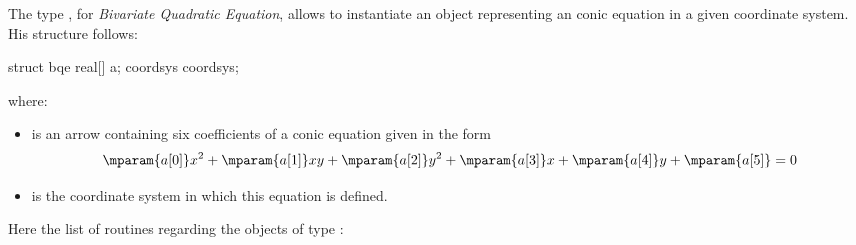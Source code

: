 \documentclass[pdftex]{article}
\begin{document}
The type , for \emph{Bivariate Quadratic Equation}, allows
to instantiate an object representing an conic equation in a given
coordinate system.  His structure follows:
\begin{center}
  \begin{Vcolor}
    struct bqe
    {
      real[] a;
      coordsys coordsys;
    }
  \end{Vcolor}
\end{center}
\noindent where:
\begin{itemize}
\item {} is an arrow containing six coefficients of a conic equation
  given in the form \[\mparam{a[0]}x^2 + \mparam{a[1]}xy + \mparam{a[2]}y^2 + \mparam{a[3]}x + \mparam{a[4]}y + \mparam{a[5]}=0\]
\item {} is the coordinate system in which this
  equation is defined.
\end{itemize}
Here the list of routines regarding the objects of type :
\end{document}
